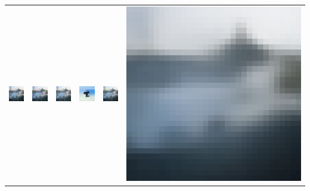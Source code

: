 \begin{table}[h!]
{\begin{tabular}{cccccc}
        \includegraphics[width=.145\textwidth]{chapter4/figures/images/cifar10/original/3.png} &   
        \includegraphics[width=.145\textwidth]{chapter4/figures/images/cifar10/reconstruction/3.png} &
        \includegraphics[width=.145\textwidth]{chapter4/figures/images/cifar10/corrected_reconstruction/3.png} &
        \includegraphics[width=.145\textwidth]{chapter4/figures/images/cifar10/diffusion_decoder_beta_0.01/3.png} &
        \includegraphics[width=.145\textwidth]{chapter4/figures/images/cifar10/diffusion_decoder_beta_0/3.png} &
        \includegraphics[width=.145\textwidth]{chapter4/figures/images/cifar10/VAE_reconstruction/3.png} \\


\end{tabular}}
\end{table}
